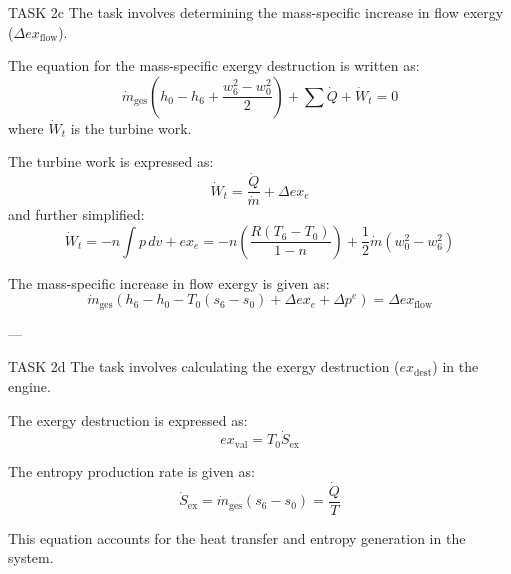 TASK 2c  
The task involves determining the mass-specific increase in flow exergy (\( \Delta ex_{\text{flow}} \)).

The equation for the mass-specific exergy destruction is written as:  
\[
\dot{m}_{\text{ges}} \left( h_0 - h_6 + \frac{w_6^2 - w_0^2}{2} \right) + \sum \dot{Q} + \dot{W}_t = 0
\]  
where \( \dot{W}_t \) is the turbine work.  

The turbine work is expressed as:  
\[
\dot{W}_t = \frac{\dot{Q}}{\dot{m}} + \Delta ex_e
\]  
and further simplified:  
\[
\dot{W}_t = -n \int p \, dv + ex_e = -n \left( \frac{R(T_6 - T_0)}{1 - n} \right) + \frac{1}{2} \dot{m} (w_0^2 - w_6^2)
\]

The mass-specific increase in flow exergy is given as:  
\[
\dot{m}_{\text{ges}} \left( h_6 - h_0 - T_0 (s_6 - s_0) + \Delta ex_e + \Delta p^e \right) = \Delta ex_{\text{flow}}
\]

---

TASK 2d  
The task involves calculating the exergy destruction (\( ex_{\text{dest}} \)) in the engine.

The exergy destruction is expressed as:  
\[
ex_{\text{val}} = T_0 \dot{S}_{\text{ex}}
\]  

The entropy production rate is given as:  
\[
\dot{S}_{\text{ex}} = \dot{m}_{\text{ges}} (s_6 - s_0) = \frac{\dot{Q}}{T}
\]  

This equation accounts for the heat transfer and entropy generation in the system.